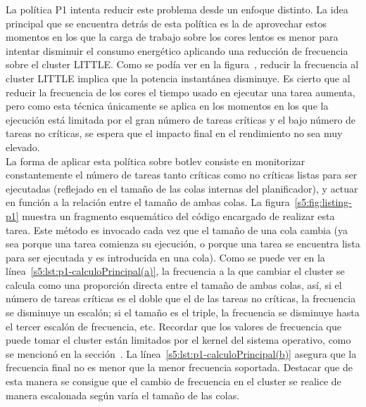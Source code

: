 La política P1 intenta reducir este problema desde un enfoque distinto. La
idea principal que se encuentra detrás de esta política es la de aprovechar
estos momentos en los que la carga de trabajo sobre los cores lentos es
menor para intentar disminuir el consumo energético aplicando una reducción
de frecuencia sobre el cluster LITTLE. Como se podía ver en la
figura~, reducir la frecuencia al cluster LITTLE implica que la
potencia instantánea disminuye. Es cierto que al reducir la frecuencia de
los cores el tiempo usado en ejecutar una tarea aumenta, pero como esta
técnica únicamente se aplica en los momentos en los que la ejecución está
limitada por el gran número de tareas críticas y el bajo número de tareas
no críticas, se espera que el impacto final en el rendimiento no sea muy
elevado.\\
La forma de aplicar esta política sobre botlev consiste en monitorizar
constantemente el número de tareas tanto críticas como no críticas listas
para ser ejecutadas (reflejado en el tamaño de las colas internas del
planificador), y actuar en función a la relación entre el tamaño de ambas
colas. La figura~\ref{s5:fig:listing-p1} muestra un fragmento esquemático
del código encargado de realizar esta tarea. Este método es invocado cada
vez que el tamaño de una cola cambia (ya sea porque una tarea comienza su
ejecución, o porque una tarea se encuentra lista para ser ejecutada y es
introducida en una cola). Como se puede ver en la
línea~\ref{s5:lst:p1-calculoPrincipal(a)}, la frecuencia a la que cambiar
el cluster se calcula como una proporción directa entre el tamaño de ambas
colas, así, si el número de tareas críticas es el doble que el de las
tareas no críticas, la frecuencia se disminuye un escalón; si el tamaño es
el triple, la frecuencia se disminuye hasta el tercer escalón de
frecuencia, etc. Recordar que los valores de frecuencia que puede tomar el
cluster están limitados por el kernel del sistema operativo, como se
mencionó en la sección~. La
línea~\ref{s5:lst:p1-calculoPrincipal(b)} asegura que la frecuencia final
no es menor que la menor frecuencia soportada. Destacar que de esta manera
se consigue que el cambio de frecuencia en el cluster se realice de manera
escalonada según varía el tamaño de las colas.\\
